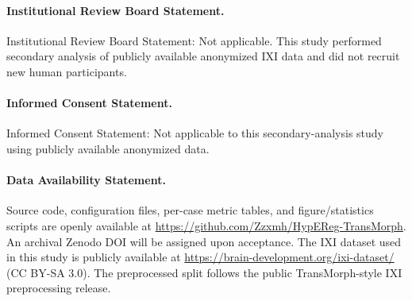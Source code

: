\documentclass[11pt,a4paper]{article}
\begin{document}
\paragraph{Institutional Review Board Statement.}
Institutional Review Board Statement: Not applicable. This study performed secondary analysis of publicly available anonymized IXI data and did not recruit new human participants.

\paragraph{Informed Consent Statement.}
Informed Consent Statement: Not applicable to this secondary-analysis study using publicly available anonymized data.

\paragraph{Data Availability Statement.}
Source code, configuration files, per-case metric tables, and figure/statistics scripts are openly available at \url{https://github.com/Zzxmh/HypEReg-TransMorph}. An archival Zenodo DOI will be assigned upon acceptance. The IXI dataset used in this study is publicly available at \url{https://brain-development.org/ixi-dataset/} (CC BY-SA 3.0). The preprocessed split follows the public TransMorph-style IXI preprocessing release.

\end{document}
